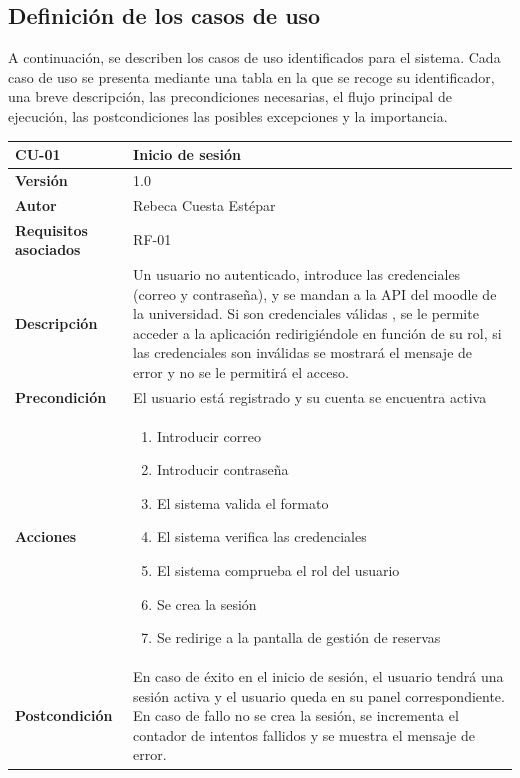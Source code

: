 \subsection{Definición de los casos de uso}

A continuación, se describen los casos de uso identificados para el sistema. Cada caso de uso se presenta mediante una tabla en la que se recoge su identificador, una breve descripción, las precondiciones necesarias, el flujo principal de ejecución, las postcondiciones las posibles excepciones y la importancia.

\begin{table}[p]
	\centering
	\begin{tabularx}{\linewidth}{ p{} p{} }
		\toprule
		\textbf{CU-01}    & \textbf{Inicio de sesión}\\
		\toprule
		\textbf{Versión}              & 1.0    \\
		\textbf{Autor}                & Rebeca Cuesta Estépar \\
		\textbf{Requisitos asociados} & RF-01 \\
		\textbf{Descripción}          & Un usuario no autenticado, introduce las credenciales (correo y contraseña), y se mandan a la API del moodle de la universidad. Si son credenciales válidas , se le permite acceder a la aplicación redirigiéndole en función de su rol, si las credenciales son inválidas se mostrará el mensaje de error y no se le permitirá el acceso. \\
		\textbf{Precondición}         & El usuario está registrado y su cuenta se encuentra activa \\
		\textbf{Acciones}             & 
		\begin{enumerate}
			\def\labelenumi{\arabic{enumi}.}
			\tightlist
			\item Introducir correo
			\item Introducir contraseña
			\item El sistema valida el formato
			\item El sistema verifica las credenciales
			\item El sistema comprueba el rol del usuario
			\item Se crea la sesión
			\item Se redirige a la pantalla de gestión de reservas
		\end{enumerate}\\
		\textbf{Postcondición}        & En caso de éxito en el inicio de sesión, el usuario tendrá una sesión activa y el usuario queda en su panel correspondiente. En caso de fallo no se crea la sesión, se incrementa el contador de intentos fallidos y se muestra el mensaje de error. \\

\end{tabularx}
\end{table}
